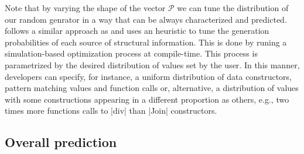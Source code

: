 Note that by varying the shape of the vector $\mathcal{P}$ we can tune the
distribution of our random genrator in a way that can be always characterized
and predicted.
%
\dragenp follows a similar approach as \dragen and uses an heuristic to tune the
generation probabilities of each source of structural information.
%
This is done by runing a simulation-based optimization process at compile-time.
%
This process is parametrized by the desired distribution of values set by the
user.
%
In this manner, developers can specify, for instance, a uniform distribution of
data constructors, pattern matching values and function calls or, alternative, a
distribution of values with some constructions appearing in a different
proportion as others, e.g., two times more functions calls to |div| than |Join|
constructors.

\subsection{Overall prediction}
%

